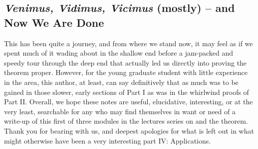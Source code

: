\subsection{\textit{Venimus, Vidimus, Vicimus} (mostly) -- and Now We Are Done}
This has been quite a journey, and from where we stand now, it may feel as if we spent much of it wading about in the shallow end before a jam-packed and speedy tour through the deep end that actually led us directly into proving the \pw theorem proper. However, for the young graduate student with little experience in the area, this author, at least, can say definitively that as much was to be gained in those slower, early sections of Part I as was in the whirlwind proofs of Part II. Overall, we hope these notes are useful, elucidative, interesting, or at the very least, searchable for any who may find themselves in want or need of a write-up of this first of three modules in the lectures series on \omy and the \pw theorem. Thank you for bearing with us, and deepest apologies for what is left out in what might otherwise have been a very interesting part IV: Applications.